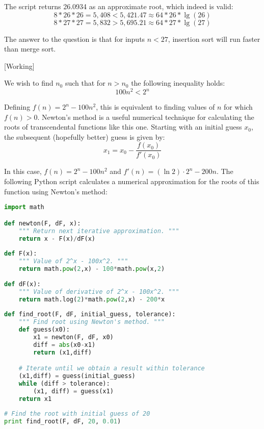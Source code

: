 \documentclass[a4paper,12pt]{article}
\begin{document}
The script returns 26.0934 as an approximate root, which indeed is valid:
\[ 8 * 26 * 26 = 5,408 < 5,421.47 \approx 64 * 26 * \lg(26) \]
\[ 8 * 27 * 27 = 5,832 > 5,695.21 \approx 64 * 27 * \lg(27) \]

The answer to the question is that for inputs $n < 27$, insertion sort will 
run faster than merge sort.

[Working]

\vspace{5mm}


We wish to find $n_0$ such that for $n > n_0$ the following inequality holds:
\[ 100n^2 < 2^n \]

Defining $f(n) = 2^n - 100n^2$, this is equivalent to finding values of $n$ for which $f(n) > 0$.
Newton's method is a useful numerical technique for calculating the roots of transcendental functions like this one.
Starting with an initial guess $x_0$, the subsequent (hopefully better) guess is given by:
\[ x_1 = x_0 - \frac{f(x_0)}{f'(x_0)} \]

In this case, $f(n) = 2^n - 100n^2$ and $f'(n) = (\ln 2) \cdot 2^n - 200 n$.
The following Python script calculates a numerical approximation for the roots of this function using Newton's method:


\begin{lstlisting}[language=Python]
import math

def newton(F, dF, x):
    """ Return next iterative approximation. """
    return x - F(x)/dF(x)
    
def F(x):
    """ Value of 2^x - 100x^2. """
    return math.pow(2,x) - 100*math.pow(x,2)
    
def dF(x):
    """ Value of derivative of 2^x - 100x^2. """
    return math.log(2)*math.pow(2,x) - 200*x
    
def find_root(F, dF, initial_guess, tolerance):
    """ Find root using Newton's method. """
    def guess(x0):
        x1 = newton(F, dF, x0)
        diff = abs(x0-x1)
        return (x1,diff)

    # Iterate until we obtain a result within tolerance                                                   
    (x1,diff) = guess(initial_guess)
    while (diff > tolerance):
        (x1, diff) = guess(x1)
    return x1
    
# Find the root with initial guess of 20                                                                                            
print find_root(F, dF, 20, 0.01)
\end{lstlisting}
\end{document}
